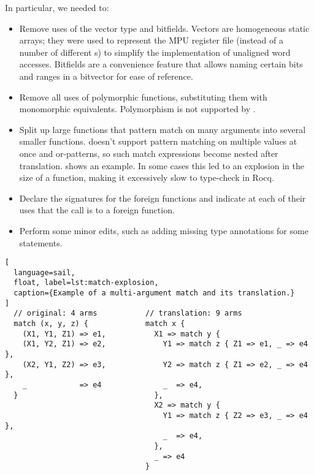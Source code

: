 In particular, we needed to:
\begin{itemize}
\item Remove uses of the vector type and bitfields. Vectors are homogeneous static arrays; they were used to represent the MPU register file (instead of a number of different s) to simplify the implementation of unaligned word accesses. Bitfields are a convenience feature that allows naming certain bits and ranges in a bitvector for ease of reference.

\item Remove all uses of polymorphic functions, substituting them with monomorphic equivalents. Polymorphism is not supported by \usail.

\item Split up large functions that pattern match on many arguments into several smaller functions. \usail doesn't support pattern matching on multiple values at once and or-patterns, so such match expressions become nested after translation.  shows an example. In some cases this led to an explosion in the size of a \usail function, making it excessively slow to type-check in Rocq.

\item Declare the signatures for the foreign functions and indicate at each of their uses that the call is to a foreign function.

\item Perform some minor edits, such as adding missing type annotations for some statements.
\end{itemize}

\begin{lstlisting}[
  language=sail,
  float, label=lst:match-explosion,
  caption={Example of a multi-argument match and its translation.}
]
  // original: 4 arms           // translation: 9 arms
  match (x, y, z) {             match x {
    (X1, Y1, Z1) => e1,           X1 => match y {
    (X1, Y2, Z1) => e2,             Y1 => match z { Z1 => e1, _ => e4 },
    (X2, Y1, Z2) => e3,             Y2 => match z { Z1 => e2, _ => e4 },
    _            => e4              _  => e4,
  }                               },
                                  X2 => match y {
                                    Y1 => match z { Z2 => e3, _ => e4 },
                                    _  => e4,
                                  },
                                  _ => e4
                                }
\end{lstlisting}

